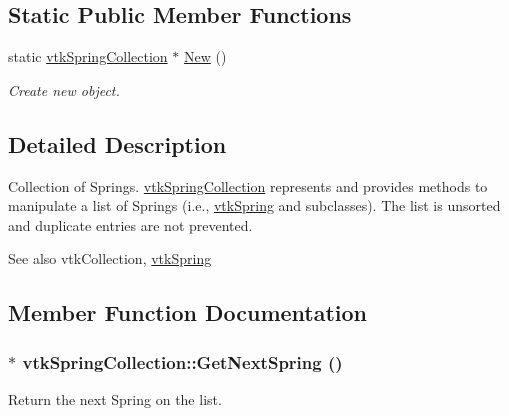 \subsection*{Static Public Member Functions}
\begin{DoxyCompactItemize}
\item 
\hypertarget{classvtkSpringCollection_aefcf75a6c39d1d7009b459a9d5dcbc1c}{
static \hyperlink{classvtkSpringCollection}{vtkSpringCollection} $\ast$ \hyperlink{classvtkSpringCollection_aefcf75a6c39d1d7009b459a9d5dcbc1c}{New} ()}
\label{classvtkSpringCollection_aefcf75a6c39d1d7009b459a9d5dcbc1c}

\begin{DoxyCompactList}\small\item\em Create new object. \item\end{DoxyCompactList}\end{DoxyCompactItemize}


\subsection{Detailed Description}
Collection of Springs. \hyperlink{classvtkSpringCollection}{vtkSpringCollection} represents and provides methods to manipulate a list of Springs (i.e., \hyperlink{classvtkSpring}{vtkSpring} and subclasses). The list is unsorted and duplicate entries are not prevented. \begin{DoxySeeAlso}{See also}
vtkCollection, \hyperlink{classvtkSpring}{vtkSpring} 
\end{DoxySeeAlso}


\subsection{Member Function Documentation}
\hypertarget{classvtkSpringCollection_ad62eec63dc1e519ca28f9d2dc96818af}{
\subsubsection[{GetNextSpring}]{ $\ast$ vtkSpringCollection::GetNextSpring ()}}
\label{classvtkSpringCollection_ad62eec63dc1e519ca28f9d2dc96818af}


Return the next Spring on the list. 


